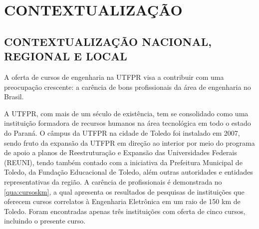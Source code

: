 \chapter{CONTEXTUALIZAÇÃO}

\section{CONTEXTUALIZAÇÃO NACIONAL, REGIONAL E LOCAL}

A oferta de cursos de engenharia na UTFPR visa a contribuir com uma preocupação crescente: a carência de bons profissionais da área de engenharia no Brasil. 

A UTFPR, com mais de um século de existência, tem se consolidado como uma instituição formadora de recursos humanos na área tecnológica em todo o estado do Paraná. O câmpus da UTFPR na cidade de Toledo foi instalado em 2007, sendo fruto da expansão da UTFPR em direção ao interior por meio do programa de apoio a planos de Reestruturação e Expansão das Universidades Federais (REUNI), tendo também contado com a iniciativa da Prefeitura Municipal de Toledo, da Fundação Educacional de Toledo, além outras autoridades e entidades representativas da região. A carência de profissionais é demonstrada no \autoref{qua:cursoskm}, a qual apresenta os resultados de pesquisas de instituições que oferecem cursos correlatos à Engenharia Eletrônica em um raio de 150 km de Toledo. Foram encontradas apenas três instituições com oferta de cinco cursos, incluindo o presente curso.


